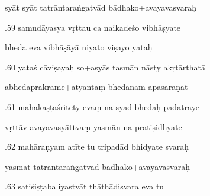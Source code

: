 \documentclass[article,12pt,a4paper]{memoir}%
\newcounter{parCount}
\begin{document}
	  
	  \pstart \leavevmode%
	syāt syāt tatrāntaraṅgatvād bādhako+avayavasvaraḥ 
	{}
	\pend%
      

	  
	  \pstart {}.59 samudāyasya vṛttau ca naikadeśo vibhāṣyate 
	{}
	\pend%
      

	  
	  \pstart \leavevmode%
	bheda eva vibhāṣāyā niyato viṣayo yataḥ 
	{}
	\pend%
      

	  
	  \pstart {}.60 yataś cāviṣayaḥ so+asyās tasmān nāsty akṛtārthatā 
	{}
	\pend%
      

	  
	  \pstart \leavevmode%
	abhedaprakrame+atyantaṃ bhedānām apasāraṇāt 
	{}
	\pend%
      

	  
	  \pstart {}.61 mahākaṣṭaśritety evaṃ na syād bhedaḥ padatraye 
	{}
	\pend%
      

	  
	  \pstart \leavevmode%
	vṛttāv avayavasyāttvaṃ yasmān na pratiṣidhyate 
	{}
	\pend%
      

	  
	  \pstart {}.62 mahāraṇyam atīte tu tripadād bhidyate svaraḥ 
	{}
	\pend%
      

	  
	  \pstart \leavevmode%
	yasmāt tatrāntaraṅgatvād bādhako+avayavasvaraḥ 
	{}
	\pend%
      

	  
	  \pstart {}.63 satiśiṣṭabaliyastvāt thāthādisvara eva tu 
	{}
	\pend%
      
\end{document}
